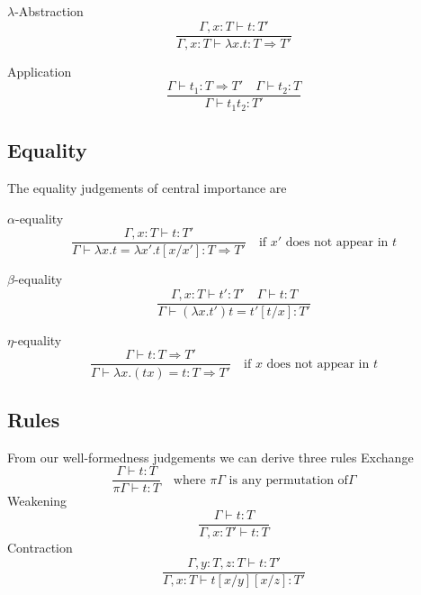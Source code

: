 \documentclass{article}
\theoremstyle{definition}
\begin{document}
$\lambda$-Abstraction
$$
\frac
{\Gamma, x : T \vdash t : T\prime}
{\Gamma, x : T \vdash \lambda x.t : T \Rightarrow T\prime}
$$

Application
$$
\frac
{\Gamma \vdash t_1 : T \Rightarrow T\prime \quad \Gamma \vdash t_2 : T}
{\Gamma \vdash t_1 t_2 : T\prime}
$$

\subsection{Equality}
The equality judgements of central importance are

$\alpha$-equality
$$
\frac
{\Gamma, x : T \vdash t : T\prime}
{\Gamma \vdash \lambda x.t = \lambda x\prime.t[x/x\prime] : T \Rightarrow T\prime}
\quad
\textrm{if $x\prime$ does not appear in $t$}
$$

$\beta$-equality
$$
\frac
{\Gamma, x : T \vdash t\prime : T\prime \quad \Gamma \vdash t : T}
{\Gamma \vdash (\lambda x.t\prime)t = t\prime[t/x]: T\prime }
$$

$\eta$-equality
$$
\frac
{\Gamma \vdash t : T \Rightarrow T\prime}
{\Gamma \vdash \lambda x.(tx) = t : T \Rightarrow T\prime}
\quad
\textrm{if $x$ does not appear in $t$}
$$

\subsection{Rules}
From our well-formedness judgements we can derive three rules
\vspace{4mm}
Exchange
$$
\frac
{\Gamma \vdash t : T}
{\pi\Gamma \vdash t : T}
\quad
\textrm{where }
\pi \Gamma
\textrm{ is any permutation of}
\Gamma
$$
Weakening
$$
\frac
{\Gamma \vdash t : T}
{\Gamma, x : T\prime \vdash t : T}
$$
Contraction
$$
\frac
{\Gamma, y : T, z : T \vdash t : T\prime}
{\Gamma, x : T \vdash t[x/y][x/z] : T\prime}
$$
\end{document}
